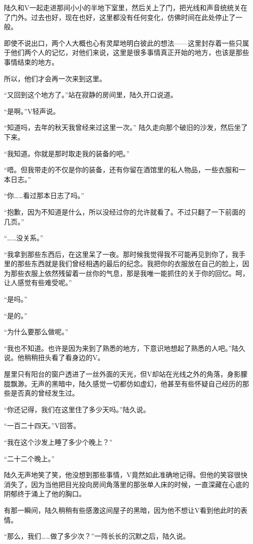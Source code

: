 陆久和V一起走进那间小小的半地下室里，然后关上了门，把光线和声音统统关在了门外。过去也好，现在也好，这里都没有任何变化，仿佛时间在此处停止了一般。

即使不说出口，两个人大概也心有灵犀地明白彼此的想法——这里封存着一些只属于他们两个人的记忆，对他们来说，这里是很多事情真正开始的地方，也该是那些事情结束的地方。

所以，他们才会再一次来到这里。

“又回到这个地方了。”站在寂静的房间里，陆久开口说道。

“是啊。”V轻声说。

“知道吗，去年的秋天我曾经来过这里一次。” 陆久走向那个破旧的沙发，然后坐了下来。

“我知道。你就是那时取走我的装备的吧。”

“唔。但我带走的不仅是你的装备，还有你留在酒馆里的私人物品，一些衣服和一本日志。”

“你……看过那本日志了吗。”

“抱歉，因为不知道是什么，所以没经过你的允许就看了。不过只翻了一下前面的几页。”

“……没关系。”

“我拿到那些东西后，在这里呆了一夜。那时候我觉得我不可能再见到你了，我手里的那些东西就是我们曾经相遇的最后的纪念。我把你的衣服放在自己的脸上，因为那些衣服上依然残留着一丝你的气息，那是我唯一能抓住的关于你的回忆。呵，让人感觉有些难受呢。”

“是吗。”

“是的。”

“为什么要那么做呢。”

“我也不知道。也许是因为来到了熟悉的地方，下意识地想起了熟悉的人吧。”陆久说。他稍稍扭头看了看身边的V。

屋里只有阳台的窗户透进了一丝外面的天光，但V却站在光线之外的角落，身影朦胧飘渺。无声的黑暗中，陆久感觉一切都仿如虚幻，他甚至有些怀疑自己经历的那些是否真的曾经发生过。

“你还记得，我们在这里住了多少天吗。”陆久说。

“一百二十四天。”V回答。

“我在这个沙发上睡了多少个晚上？”

“二十二个晚上。”

陆久无声地笑了笑，他没想到那些事情，V竟然如此准确地记得。但他的笑容很快消失了，因为当他把目光投向房间角落里的那张单人床的时候，一直深藏在心底的阴郁终于涌上了他的胸口。

有那一瞬间，陆久稍稍有些感激这间屋子的黑暗，因为他不想让V看到他此时的表情。

“那么，我们……做了多少次？”一阵长长的沉默之后，陆久说。

